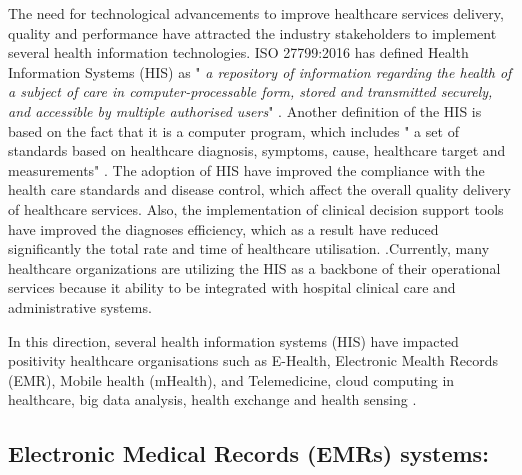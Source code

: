 
The need for technological advancements to improve healthcare services delivery, quality and performance have attracted the industry stakeholders to implement  several health information technologies. ISO 27799:2016 has defined Health Information Systems (HIS) as " \textit{a repository of information regarding the health of a subject of care in computer-processable form, stored and transmitted securely, and accessible by multiple authorised users}" \cite{TheInternationalOrganizationforStandardization2016}. Another definition of the HIS is based on the fact that it is a computer program, which  includes " a set of standards based on healthcare diagnosis, symptoms, cause, healthcare target and measurements" \cite{Pai2011}. The adoption of HIS have improved the compliance with the health care standards and disease control, which affect the overall quality delivery of healthcare services. Also, the implementation of clinical decision support tools have improved the diagnoses efficiency, which as a result have reduced significantly the total  rate and time of healthcare utilisation. \cite{Care2006,Akowuah2013}.Currently, many healthcare organizations are utilizing the HIS as a backbone of their operational services because it ability to be integrated with hospital clinical care and administrative systems\cite{Rahim2016}.   

In this direction, several health information systems (HIS) have impacted positivity healthcare organisations such as E-Health, Electronic Mealth Records (EMR), Mobile health (mHealth),
and Telemedicine, cloud computing in healthcare, big data analysis, health exchange and health sensing \cite{WorldHealthOrganization2016,Yang2015}. 


\subsection{Electronic Medical Records (EMRs) systems:}

